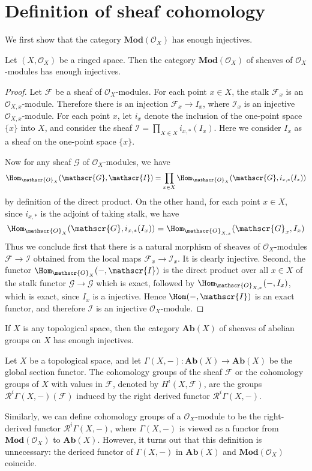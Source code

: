 \section{Definition of sheaf cohomology}
We first show that the category $\mathbf{Mod}(\mathscr{O}_X)$ has enough injectives.
\begin{proposition}
Let $(X,\mathscr{O}_X)$ be a ringed space. Then the category $\mathbf{Mod}(\mathscr{O}_X)$ of sheaves of $\mathscr{O}_X$-modules has enough injectives.
\end{proposition}
\begin{proof}
Let $\mathscr{F}$ be a sheaf of $\mathscr{O}_X$-modules. For each point $x\in X$, the stalk $\mathscr{F}_x$ is an $\mathscr{O}_{X,x}$-module. Therefore there is an injection $\mathscr{F}_x\to I_x$, where $\mathscr{I}_x$ is an injective $\mathscr{O}_{X,x}$-module. For each point $x$, let $i_x$ denote the inclusion of the one-point space $\{x\}$ into $X$, and consider the sheaf $\mathscr{I}=\prod_{X\in X}i_{x,*}(I_x)$. Here we consider $I_x$ as a sheaf on the one-point space $\{x\}$.\par
Now for any sheaf $\mathscr{G}$ of $\mathscr{O}_X$-modules, we have
\[\Hom_{\mathscr{O}_{X}}(\mathscr{G},\mathscr{I})=\prod_{x\in X}\Hom_{\mathscr{O}_{X}}(\mathscr{G},i_{x,*}(I_x))\] 
by definition of the direct product. On the other hand, for each point $x\in X$, since $i_{x,*}$ is the adjoint of taking stalk, we have
\[\Hom_{\mathscr{O}_{X}}(\mathscr{G},i_{x,*}(I_x))=\Hom_{\mathscr{O}_{X,x}}(\mathscr{G}_x,I_x)\]
Thus we conclude first that there is a natural morphism of sheaves of $\mathscr{O}_X$-modules $\mathscr{F}\to\mathscr{I}$ obtained from the local maps $\mathscr{F}_x\to\mathscr{I}_x$. It is clearly injective. Second, the functor $\Hom_{\mathscr{O}_{X}}(-,\mathscr{I})$ is the direct product over all $x\in X$ of the stalk functor $\mathscr{G}\to\mathscr{G}$ which is exact, followed by $\Hom_{\mathscr{O}_{X,x}}(-,I_x)$, which is exact, since $I_x$ is a injective. Hence $\Hom(-,\mathscr{I})$ is an exact functor, and therefore $\mathscr{I}$ is an injective $\mathscr{O}_X$-module.
\end{proof}
\begin{corollary}
If $X$ is any topological space, then the category $\mathbf{Ab}(X)$ of sheaves of abelian groups on $X$ has enough injectives.
\end{corollary}
\begin{definition}
Let $X$ be a topological space, and let $\Gamma(X,-):\mathbf{Ab}(X)\to\mathbf{Ab}(X)$ be the global section functor. The cohomology groups of the sheaf $\mathscr{F}$ or the cohomology groups of $X$ with values in $\mathscr{F}$, denoted by $H^i(X,\mathscr{F})$, are the groups $\mathcal{R}^i\Gamma(X,-)(\mathscr{F})$ induced by the right derived functor $\mathcal{R}^i\Gamma(X,-)$.
\end{definition}
Similarly, we can define cohomology groups of a $\mathscr{O}_X$-module to be the right-derived functor $\mathcal{R}^i\Gamma(X,-)$, where $\Gamma(X,-)$ is viewed as a functor from $\mathbf{Mod}(\mathscr{O}_X)$ to $\mathbf{Ab}(X)$. However, it turns out that this definition is unnecessary: the dericed functor of $\Gamma(X,-)$ in $\mathbf{Ab}(X)$ and $\mathbf{Mod}(\mathscr{O}_X)$ coincide.
